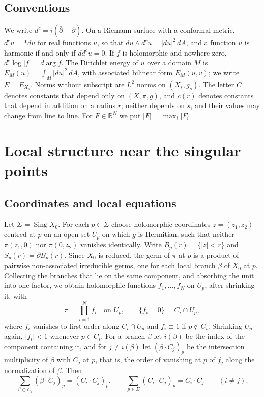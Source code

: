 \documentclass[11pt]{amsart}
\theoremstyle{definition}
\theoremstyle{remark}
\newcommand{\RR}{\mathbb R}
\newcommand{\Sing}{\operatorname{Sing}}
\newcommand{\dc}{d^c}
\begin{document}
\subsection{Conventions}
We write $\dc=i(\bar\partial-\partial)$. On a Riemann surface with a
conformal metric, $\dc u=*du$ for real functions $u$, so that
$du\wedge\dc u=|du|^2\,dA$, and a function $u$ is harmonic if and only if
$d\dc u=0$. If $f$ is holomorphic and nowhere zero, $\dc\log|f|=d\arg f$.
The Dirichlet energy of $u$ over a domain $M$ is
$E_M(u)=\int_M|du|^2\,dA$, with associated bilinear form $E_M(u,v)$;
we write $E=E_{X_s}$. Norms without subscript are $L^2$ norms on
$(X_s,g_s)$. The letter $C$ denotes constants that depend only on
$(X,\pi,g)$, and $c(r)$ denotes constants that depend in addition on a
radius $r$; neither depends on $s$, and their values may change from line
to line. For $F\in\RR^N$ we put $|F|=\max_i|F_i|$.

\section{Local structure near the singular points}\label{sec:local}

\subsection{Coordinates and local equations}
Let $\Sigma=\Sing X_0$. For each $p\in\Sigma$ choose holomorphic
coordinates $z=(z_1,z_2)$ centred at $p$ on an open set $U_p$ on which $g$
is Hermitian, such that neither $\pi(z_1,0)$ nor $\pi(0,z_2)$ vanishes
identically. Write $B_p(r)=\{|z|<r\}$ and $S_p(r)=\partial B_p(r)$.
Since $X_0$ is reduced, the germ of $\pi$ at $p$ is a product of pairwise
non-associated irreducible germs, one for each local branch $\beta$ of
$X_0$ at $p$. Collecting the branches that lie on the same component, and
absorbing the unit into one factor, we obtain holomorphic functions
$f_{1},\ldots,f_{N}$ on $U_p$, after shrinking it, with
\begin{equation}\label{eq:factor}
 \pi=\prod_{i=1}^Nf_i\quad\text{on }U_p,\qquad
 \{f_i=0\}=C_i\cap U_p ,
\end{equation}
where $f_i$ vanishes to first order along $C_i\cap U_p$ and
$f_i\equiv1$ if $p\notin C_i$. Shrinking $U_p$ again, $|f_i|<1$ whenever
$p\in C_i$. For a branch $\beta$ let $i(\beta)$ be the index of the
component containing it, and for $j\ne i(\beta)$ let $(\beta\cdot C_j)_p$
be the intersection multiplicity of $\beta$ with $C_j$ at $p$, that is,
the order of vanishing at $p$ of $f_j$ along the normalization of $\beta$.
Then
\begin{equation}\label{eq:local-intersection}
 \sum_{\beta\subset C_i}(\beta\cdot C_j)_p=(C_i\cdot C_j)_p,\qquad
 \sum_{p\in\Sigma}(C_i\cdot C_j)_p=C_i\cdot C_j\qquad(i\ne j).
\end{equation}
\end{document}
